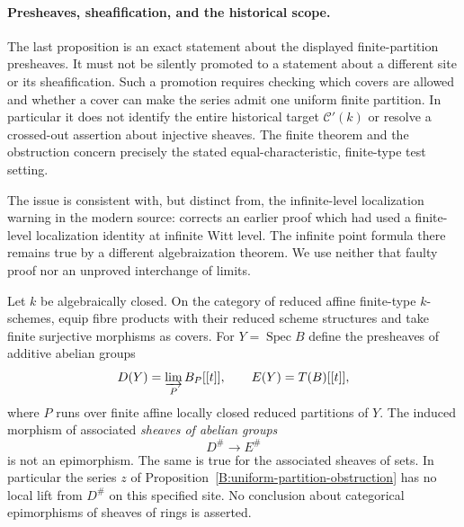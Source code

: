 \paragraph{Presheaves, sheafification, and the historical scope.}
The last proposition is an exact statement about the displayed
finite-partition presheaves.  It must not be silently promoted to a
statement about a different site or its sheafification.  Such a
promotion requires checking which covers are allowed and whether a
cover can make the series admit one uniform finite partition.  In
particular it does not identify the entire historical target
$\mathcal C'(k)$ or resolve a crossed-out assertion about injective
sheaves.  The finite theorem and the obstruction concern precisely
the stated equal-characteristic, finite-type test setting.

The issue is consistent with, but distinct from, the infinite-level
localization warning in the modern source:
\cite[Proposition~18.2 and Remark~18.3, pp.~99--100]{BBertapelleGonzalezAviles2022}
corrects an earlier proof which had used a finite-level localization
identity at infinite Witt level.  The infinite point formula there
remains true by a different algebraization theorem.  We use neither
that faulty proof nor an unproved interchange of limits.

\begin{proposition}\label{B:finite-cover-partition-obstruction}
Let $k$ be algebraically closed.  On the category of reduced affine
finite-type $k$-schemes, equip fibre products with their reduced scheme
structures and take finite surjective morphisms as covers.  For
$Y=\operatorname{Spec}B$ define the presheaves of additive abelian groups
\[
 D(Y)=\varinjlim_P B_P[[t]],\qquad E(Y)=T(B)[[t]],
\]
where $P$ runs over finite affine locally closed reduced partitions of
$Y$.  The induced morphism of associated \emph{sheaves of abelian groups}
\[
 D^\#\longrightarrow E^\#
\]
is not an epimorphism.  The same is true for the associated sheaves of
sets.  In particular the series $z$ of
Proposition~\ref{B:uniform-partition-obstruction} has no local lift from
$D^\#$ on this specified site.  No conclusion about categorical
epimorphisms of sheaves of rings is asserted.
\end{proposition}


